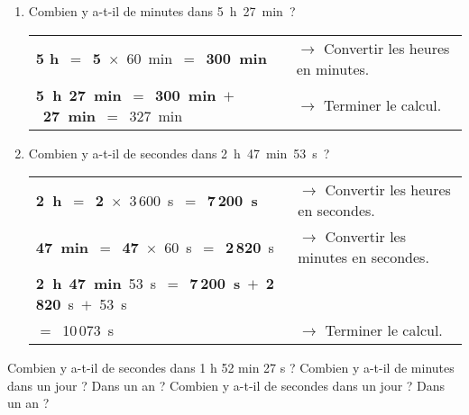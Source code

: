 \begin{methode*1}

\begin{exemple*1}

\begin{enumerate}
\item Combien y a-t-il de minutes dans 5 h 27 min ?

\begin{tabular}{ll} 
\textcolor{bleu}{\textbf{5 h}} $=$ \textcolor{bleu}{\textbf{5}} $\times$ 60 min $=$ \textcolor{bleu}{\textbf{300 min}}  & $\rightarrow$ Convertir les heures en minutes. \\
\textcolor{bleu}{\textbf{5 h}} \textcolor{vert}{\textbf{27 min}} $=$ \textcolor{bleu}{\textbf{300 min}} $+$ \textcolor{vert}{\textbf{27 min}} $=$ 327 min & $\rightarrow$ Terminer le calcul.\\
\end{tabular} 

\vspace{2em}\item Combien y a-t-il de secondes dans 2 h 47 min 53 s ?

\begin{tabular}{ll} 
\textcolor{bleu}{\textbf{2 h}} $=$ \textcolor{bleu}{\textbf{2}} $\times$ 3\,600 s $=$ \textcolor{bleu}{\textbf{7\,200 s}} & $\rightarrow$ Convertir les heures en secondes. \\
\textcolor{vert}{\textbf{47 min}} $=$ \textcolor{vert}{\textbf{47}} $\times$ 60 s $=$ \textcolor{vert}{\textbf{2\,820}} s & $\rightarrow$ Convertir les minutes en secondes. \\
\textcolor{bleu}{\textbf{2 h}} \textcolor{vert}{\textbf{47 min}} 53 s $=$ \textcolor{bleu}{\textbf{7\,200 s}} $+$ \textcolor{vert}{\textbf{2\,820}} s $+$ 53 s  \\
\phantom{2 h 47 min 53 si}$=$ 10\,073 s & $\rightarrow$ Terminer le calcul. \\
\end{tabular}

\end{enumerate}
 
\end{exemple*1}

\exercice

Combien y a-t-il de secondes dans 1 h 52 min 27 s ? Combien y a-t-il de minutes dans un jour ? Dans un an ? Combien y a-t-il de secondes dans un jour ? Dans un an ?

\end{methode*1}



